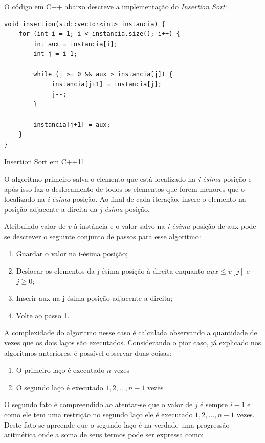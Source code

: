 \documentclass[a4paper, 12pt]{report}
\begin{document}
O código em C++ abaixo descreve a implementação do \emph{Insertion Sort}:

\begin{listing}[H]
\begin{verbatim}
void insertion(std::vector<int> instancia) {
    for (int i = 1; i < instancia.size(); i++) {
        int aux = instancia[i];
        int j = i-1;

        while (j >= 0 && aux > instancia[j]) {
             instancia[j+1] = instancia[j];
             j--;
        }

        instancia[j+1] = aux;
    }
}
\end{verbatim}
\caption{Insertion Sort em C++11}
\end{listing}

O algoritmo primeiro salva o elemento que está localizado na \emph{i-ésima} posição
e após isso faz o deslocamento de todos os elementos que forem menores que o
localizado na \emph{i-ésima} posição. Ao final de cada iteração, insere o elemento
na posição adjacente a direita da \emph{j-ésima} posição.

Atribuindo valor de $v$ à instância e o valor salvo na \emph{i-ésima} posição de
aux pode se descrever o seguinte conjunto de passos para esse algoritmo:

\begin{enumerate}
\item Guardar o valor na i-ésima posição;
\item Deslocar os elementos da j-ésima posição à direita enquanto $aux \leq v[j]$ e $j \geq 0$;
\item Inserir aux na j-ésima posição adjacente a direita;
\item Volte ao passo 1.
\end{enumerate}

A complexidade do algoritmo nesse caso é calculada observando a quantidade de
vezes que os dois laços são executados. Considerando o pior caso, já explicado
nos algoritmos anteriores, é possível observar duas coisas:

\begin{enumerate}
\item O primeiro laço é executado $n$ vezes
\item O segundo laço é executado $1, 2, ..., n-1$ vezes
\end{enumerate}

O segundo fato é compreendido ao atentar-se que o valor de $j$ é sempre $i-1$ e
como ele tem uma restrição no segundo laço ele é executado $1, 2, ..., n-1$
vezes. Deste fato se apreende que o segundo laço é na verdade uma progressão
aritmética onde a soma de seus termos pode ser expressa como:
\end{document}
